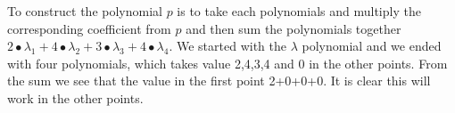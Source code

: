 \noindent
To construct the polynomial \begin{math}p\end{math} is to take each polynomials and multiply the corresponding coefficient from \begin{math}p\end{math} and then sum the polynomials together \begin{math}2∙\lambda_1+4∙\lambda_2+3∙\lambda_3+4∙\lambda_4 \end{math}. We started with the \begin{math}\lambda\end{math} polynomial and we ended with four polynomials, which takes value 2,4,3,4 and 0 in the other points. From the sum we see that the value in the first point 2+0+0+0. It is clear this will work in the other points. 

